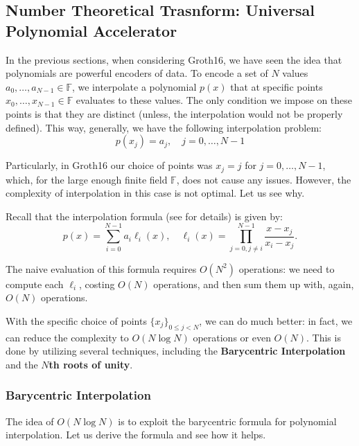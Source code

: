 \documentclass[../lecture-notes-148x210.tex]{subfiles}
\begin{document}
\subsection[Number Theoretical Trasnform]{Number Theoretical Trasnform: Universal Polynomial Accelerator}\label{section:ntt}

In the previous sections, when considering Groth16, we have seen the idea that
polynomials are powerful encoders of data. To encode a set of $N$ values
$a_0,\dots,a_{N-1} \in \mathbb{F}$, we interpolate a polynomial $p(x)$ that at
specific points $x_0,\dots,x_{N-1} \in \mathbb{F}$ evaluates to these values. The
only condition we impose on these points is that they are distinct (unless, the
interpolation would not be properly defined). This way, generally, we have the
following interpolation problem:
\begin{equation*}
    p(x_j) = a_j, \quad j = 0,\dots,N-1
\end{equation*}

Particularly, in Groth16 our choice of points was $x_j = j$ for $j = 0,\dots,N-1$, which, 
for the large enough finite field $\mathbb{F}$, does not cause any issues. However, the 
complexity of interpolation in this case is not optimal. Let us see why.

Recall that the interpolation formula (see  for details)
is given by:
\begin{equation*}
    p(x) = \sum_{i=0}^{N-1} a_i \ell_i(x), \quad \ell_i(x) = \prod_{j=0, j \neq i}^{N-1} \frac{x-x_j}{x_i-x_j}.
\end{equation*}

The naive evaluation of this formula requires $O(N^2)$ operations: we
need to compute each $\ell_i$, costing $O(N)$ operations, and then sum
them up with, again, $O(N)$ operations.

With the specific choice of points $\{x_j\}_{0 \leq j < N}$, we can do much
better: in fact, we can reduce the complexity to $O(N \log N)$ operations or
even $O(N)$. This is done by utilizing several techniques, including the
\textbf{Barycentric Interpolation} and the \textbf{$N$th roots of unity}. 

\subsubsection{Barycentric Interpolation}

The idea of $O(N \log N)$ is to exploit the barycentric formula for polynomial
interpolation. Let us derive the formula and see how it helps.
\end{document}
